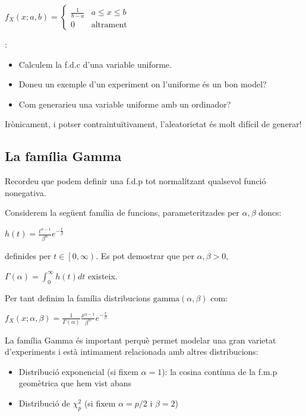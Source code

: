 \documentclass[letterpaper,10pt,english]{sphinxmanual}
\begin{document}
\(f_X\left(x; a, b\right) = \left\{\begin{array}{cc} \frac{1}{b-a} & a \leq x \leq b \\ 0 & \mbox{altrament} \end{array}\right.\)

:
\begin{itemize}
\item {} 
Calculem la f.d.c d’una variable uniforme.

\item {} 
Doneu un exemple d’un experiment on l’uniforme és un bon model?

\item {} 
Com generarieu una variable uniforme amb un ordinador?

\end{itemize}

Irònicament, i potser contraintuïtivament, l’aleatorietat és molt difícil de generar!


\subsection{La família Gamma}
\label{\detokenize{0_Intro/0_1_Repas_probabilitat:la-familia-gamma}}
Recordeu que podem definir una f.d.p tot normalitzant qualsevol funció no\sphinxhyphen{}negativa.

Considerem la següent família de funcions, parameteritzades per \(\alpha, \beta\) doncs:

\(h\left(t\right) = \frac{t^{\alpha-1}}{\beta^{\alpha}} e^{-\frac{t}{\beta}}\)

definides per \(t\in \left[0, \infty\right)\). Es pot demostrar que per \(\alpha, \beta > 0\),

\(\Gamma\left(\alpha\right)=\int_{0}^{\infty}h\left(t\right)dt\) existeix.

Per tant definim la família distribucions \(\mbox{gamma}\left(\alpha, \beta\right)\) com:

\(f_X\left(x;\alpha, \beta\right) = \frac{1}{\Gamma\left(\alpha\right)}\frac{x^{\alpha-1}}{\beta^{\alpha}} e^{-\frac{x}{\beta}}\)

La família Gamma és important perquè permet modelar una gran varietat d’experiments i està intimament
relacionada amb altres distribucions:
\begin{itemize}
\item {} 
Distribució exponencial (si fixem \(\alpha=1\)): la cosina contínua de la f.m.p geomètrica que hem vist abans

\item {} 
Distribució de \(\chi^2_p\) (si fixem \(\alpha=p/2\) i \(\beta=2\))

\end{itemize}
\end{document}
